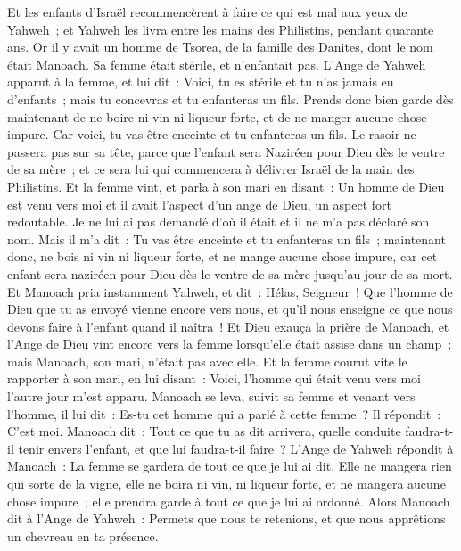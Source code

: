 \begin{multicols}{2}
\VerseOne{}Et les enfants d'Israël recommencèrent à faire ce qui est mal aux yeux de Yahweh~; et Yahweh les livra entre les mains des Philistins, pendant quarante ans.
Or il y avait un homme de Tsorea, de la famille des Danites, dont le nom était Manoach. Sa femme était stérile, et n'enfantait pas.
L'Ange de Yahweh apparut à la femme, et lui dit~: Voici, tu es stérile et tu n'as jamais eu d'enfants~; mais tu concevras et tu enfanteras un fils.
Prends donc bien garde dès maintenant de ne boire ni vin ni liqueur forte, et de ne manger aucune chose impure.
Car voici, tu vas être enceinte et tu enfanteras un fils. Le rasoir ne passera pas sur sa tête, parce que l'enfant sera Naziréen pour Dieu dès le ventre de sa mère~; et ce sera lui qui commencera à délivrer Israël de la main des Philistins.
Et la femme vint, et parla à son mari en disant~: Un homme de Dieu est venu vers moi et il avait l'aspect d'un ange de Dieu, un aspect fort redoutable. Je ne lui ai pas demandé d'où il était et il ne m'a pas déclaré son nom.
Mais il m'a dit~: Tu vas être enceinte et tu enfanteras un fils~; maintenant donc, ne bois ni vin ni liqueur forte, et ne mange aucune chose impure, car cet enfant sera naziréen pour Dieu dès le ventre de sa mère jusqu'au jour de sa mort.
Et Manoach pria instamment Yahweh, et dit~: Hélas, Seigneur~! Que l'homme de Dieu que tu as envoyé vienne encore vers nous, et qu'il nous enseigne ce que nous devons faire à l'enfant quand il naîtra~!
Et Dieu exauça la prière de Manoach, et l'Ange de Dieu vint encore vers la femme lorsqu'elle était assise dans un champ~; mais Manoach, son mari, n'était pas avec elle.
Et la femme courut vite le rapporter à son mari, en lui disant~: Voici, l'homme qui était venu vers moi l'autre jour m'est apparu.
Manoach se leva, suivit sa femme et venant vers l'homme, il lui dit~: Es-tu cet homme qui a parlé à cette femme~? Il répondit~: C'est moi.
Manoach dit~: Tout ce que tu as dit arrivera, quelle conduite faudra-t-il tenir envers l'enfant, et que lui faudra-t-il faire~?
L'Ange de Yahweh répondit à Manoach~: La femme se gardera de tout ce que je lui ai dit.
Elle ne mangera rien qui sorte de la vigne, elle ne boira ni vin, ni liqueur forte, et ne mangera aucune chose impure~; elle prendra garde à tout ce que je lui ai ordonné.
Alors Manoach dit à l'Ange de Yahweh~: Permets que nous te retenions, et que nous apprêtions un chevreau en ta présence.

\end{multicols}
